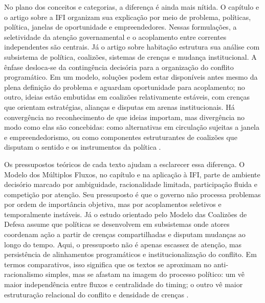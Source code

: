 \documentclass[12pt,a4paper]{article}
\begin{document}
No plano dos conceitos e categorias, a diferença é ainda mais nítida. O capítulo e o artigo sobre a IFI organizam sua explicação por meio de problema, políticas, política, janelas de oportunidade e empreendedores. Nessas formulações, a seletividade da atenção governamental e o acoplamento entre correntes independentes são centrais. Já o artigo sobre habitação estrutura sua análise com subsistema de política, coalizões, sistemas de crenças e mudança institucional. A ênfase desloca-se da contingência decisória para a organização do conflito programático. Em um modelo, soluções podem estar disponíveis antes mesmo da plena definição do problema e aguardam oportunidade para acoplamento; no outro, ideias estão embutidas em coalizões relativamente estáveis, com crenças que orientam estratégias, alianças e disputas em arenas institucionais. Há convergência no reconhecimento de que ideias importam, mas divergência no modo como elas são concebidas: como alternativas em circulação sujeitas a janela e empreendedorismo, ou como componentes estruturantes de coalizões que disputam o sentido e os instrumentos da política \parencite{brasil2022_abordagens_contemporaneas,anonsd_sem_titulo,ferreira2019_politica_habitacional}.

Os pressupostos teóricos de cada texto ajudam a esclarecer essa diferença. O Modelo dos Múltiplos Fluxos, no capítulo e na aplicação à IFI, parte de ambiente decisório marcado por ambiguidade, racionalidade limitada, participação fluida e competição por atenção. Seu pressuposto é que o governo não processa problemas por ordem de importância objetiva, mas por acoplamentos seletivos e temporalmente instáveis. Já o estudo orientado pelo Modelo das Coalizões de Defesa assume que políticas se desenvolvem em subsistemas onde atores coordenam ação a partir de crenças compartilhadas e disputam mudanças ao longo do tempo. Aqui, o pressuposto não é apenas escassez de atenção, mas persistência de alinhamentos programáticos e institucionalização do conflito. Em termos comparativos, isso significa que os textos se aproximam no anti-racionalismo simples, mas se afastam na imagem do processo político: um vê maior independência entre fluxos e centralidade do timing; o outro vê maior estruturação relacional do conflito e densidade de crenças \parencite{brasil2022_abordagens_contemporaneas,anonsd_sem_titulo,ferreira2019_politica_habitacional}.
\end{document}
